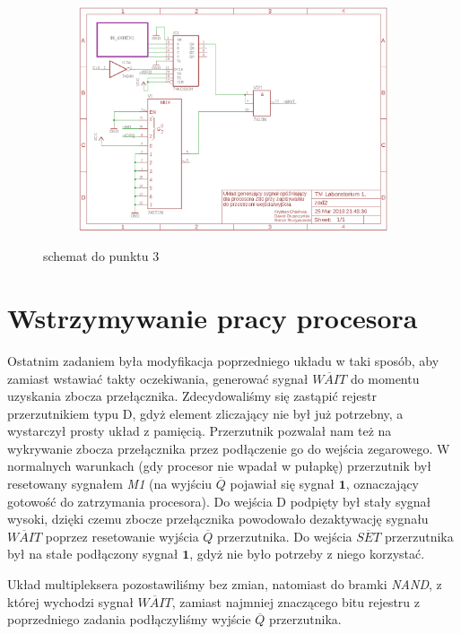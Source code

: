\documentclass[fleqn]{article}
\begin{document}
\begin{figure}[H]
	\centering
	\begin{subfigure}[b]{0.8\textwidth}
		\includegraphics[width=\textwidth]{img/z2.png}
  \end{subfigure}
	\caption{schemat do punktu 3}
\end{figure}

\section{Wstrzymywanie pracy procesora}
Ostatnim zadaniem była modyfikacja poprzedniego układu w taki sposób, aby zamiast wstawiać takty oczekiwania, generować sygnał $\overline{WAIT}$ do momentu uzyskania zbocza przełącznika.
Zdecydowaliśmy się zastąpić rejestr przerzutnikiem typu D, gdyż element zliczający nie był już potrzebny, a wystarczył prosty układ z pamięcią. Przerzutnik pozwalał nam też na wykrywanie zbocza przełącznika przez podłączenie go do wejścia zegarowego.
W normalnych warunkach (gdy procesor nie wpadał w pułapkę) przerzutnik był resetowany sygnałem \textit{M1} (na wyjściu $\overline{Q}$ pojawiał się sygnał $\textbf{1}$, oznaczający gotowość do zatrzymania procesora). Do wejścia D podpięty był stały sygnał wysoki, dzięki czemu zbocze przełącznika powodowało dezaktywację sygnału $\overline{WAIT}$ poprzez resetowanie wyjścia $\overline{Q}$ przerzutnika. Do wejścia $\overline{SET}$ przerzutnika był na stałe podłączony sygnał $\textbf{1}$, gdyż nie było potrzeby z niego korzystać.

Układ multipleksera pozostawiliśmy bez zmian, natomiast do bramki \textit{NAND}, z której wychodzi sygnał $\overline{WAIT}$, zamiast najmniej znaczącego bitu rejestru z poprzedniego zadania podłączyliśmy wyjście $\overline{Q}$ przerzutnika.
\end{document}
